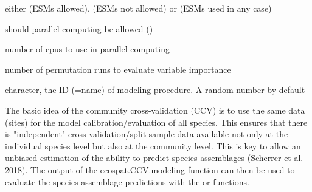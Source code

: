 \documentclass[a4paper]{book}
\begin{document}
\begin{Arguments}
\begin{ldescription}
\item[\code{ESM}] either  (ESMs allowed),  (ESMs not allowed) or  (ESMs used in any case)
\item[\code{parallel}] should parallel computing be allowed ()
\item[\code{cpus}] number of cpus to use in parallel computing
\item[\code{varImport}] number of permutation runs to evaluate variable importance
\item[\code{modeling.id}] character, the ID (=name) of modeling procedure. A random number by default
\end{ldescription}
\end{Arguments}
%
\begin{Details}\relax
The basic idea of the community cross-validation (CCV) is to use the same data (sites) for the model calibration/evaluation of all species. This ensures that there is "independent" cross-validation/split-sample data available not only at the individual species level but also at the community level. This is key to allow an unbiased estimation of the ability to predict species assemblages (Scherrer et al. 2018). 
The output of the ecospat.CCV.modeling function can then be used to evaluate the species assemblage predictions with the  or  functions.
\end{Details}
%
\end{document}

